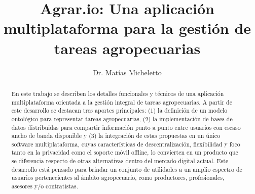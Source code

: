\documentclass[]{llncs}
\begin{document}
\title{Agrar.io: Una aplicación multiplataforma para la gestión de tareas agropecuarias}
\author{Dr. Matías Micheletto}

\maketitle

\begin{abstract}
En este trabajo se describen los detalles funcionales y técnicos de una aplicación multiplataforma orientada a la gestión integral de tareas agropecuarias. A partir de este desarrollo se destacan tres aportes principales: (1) la definición de un modelo ontológico para representar tareas agropecuarias, (2) la implementación de bases de datos distribuidas para compartir información punto a punto entre usuarios con escaso ancho de banda disponible y (3) la integración de estas propuestas en un único software multiplataforma, cuyas características de descentralización, flexibilidad y foco tanto en la privacidad como el soporte móvil offline, lo convierten en un producto que se diferencia respecto de otras alternativas dentro del mercado digital actual. Este desarrollo está pensado para brindar un conjunto de utilidades a un amplio espectro de usuarios pertenecientes al ámbito agropecuario, como productores, profesionales, asesores y/o contratistas.

\end{abstract}






\end{document}
